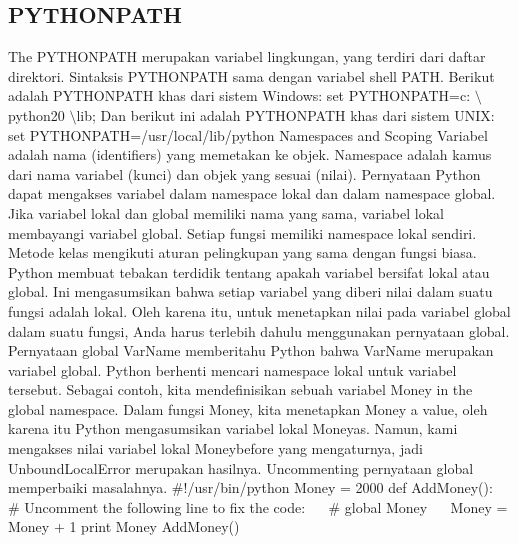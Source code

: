 \subsection{PYTHONPATH} 
The PYTHONPATH merupakan variabel lingkungan, yang terdiri dari daftar direktori. Sintaksis PYTHONPATH sama dengan variabel shell PATH. 
Berikut adalah PYTHONPATH khas dari sistem Windows:
 \hspace*{0.5in} set PYTHONPATH=c: $  \setminus  $python20 $  \setminus  $lib; 
Dan berikut ini adalah PYTHONPATH khas dari sistem UNIX:
 \hspace*{0.5in} set PYTHONPATH=/usr/local/lib/python 
Namespaces and Scoping 
Variabel adalah nama (identifiers) yang memetakan ke objek. Namespace adalah kamus dari nama variabel (kunci) dan objek yang sesuai (nilai). 
Pernyataan Python dapat mengakses variabel dalam namespace lokal dan dalam namespace global. Jika variabel lokal dan global memiliki nama yang sama, variabel lokal membayangi variabel global. Setiap fungsi memiliki namespace lokal sendiri. Metode kelas mengikuti aturan pelingkupan yang sama dengan fungsi biasa. 
Python membuat tebakan terdidik tentang apakah variabel bersifat lokal atau global. Ini mengasumsikan bahwa setiap variabel yang diberi nilai dalam suatu fungsi adalah lokal.
Oleh karena itu, untuk menetapkan nilai pada variabel global dalam suatu fungsi, Anda harus terlebih dahulu menggunakan pernyataan global. 
Pernyataan global VarName memberitahu Python bahwa VarName merupakan variabel global. Python berhenti mencari namespace lokal untuk variabel tersebut. 
Sebagai contoh, kita mendefinisikan sebuah variabel Money in the global namespace. Dalam fungsi Money, kita menetapkan Money a value, oleh karena itu Python mengasumsikan variabel lokal Moneyas. Namun, kami mengakses nilai variabel lokal Moneybefore yang mengaturnya, jadi UnboundLocalError merupakan hasilnya. Uncommenting pernyataan global memperbaiki masalahnya.
 \hspace*{0.5in}  $  \#  $!/usr/bin/python 
 \hspace*{0.5in} Money = 2000 
 \hspace*{0.5in} def AddMoney():
 \hspace*{0.5in} ~~  $  \#  $ Uncomment the following line to fix the code:
 \hspace*{0.5in} ~~  $  \#  $ global Money 
 \hspace*{0.5in} ~~ Money = Money + 1 
 \hspace*{0.5in} print Money 
 \hspace*{0.5in} AddMoney() 
